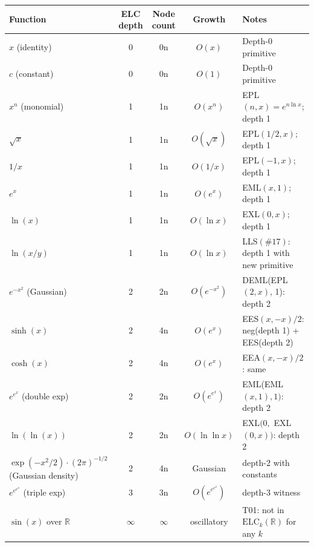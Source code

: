 \documentclass[11pt]{article}
\begin{document}
\begin{longtable}{lcccp{5cm}}
\toprule
Function & ELC depth & Node count & Growth & Notes \\
\midrule
\endhead

$x$ (identity) & 0 & 0n & $O(x)$ & Depth-0 primitive \\

$c$ (constant) & 0 & 0n & $O(1)$ & Depth-0 primitive \\

$x^n$ (monomial) & 1 & 1n & $O(x^n)$ & EPL$(n,x) = e^{n\ln x}$; depth 1 \\

$\sqrt{x}$       & 1 & 1n & $O(\sqrt{x})$ & EPL$(1/2,x)$; depth 1 \\

$1/x$            & 1 & 1n & $O(1/x)$ & EPL$(-1,x)$; depth 1 \\

$e^x$            & 1 & 1n & $O(e^x)$ & EML$(x,1)$; depth 1 \\

$\ln(x)$         & 1 & 1n & $O(\ln x)$ & EXL$(0,x)$; depth 1 \\

$\ln(x/y)$       & 1 & 1n & $O(\ln x)$ & LLS$(\#17)$: depth 1 with new primitive \\

$e^{-x^2}$ (Gaussian) & 2 & 2n & $O(e^{-x^2})$ & DEML(EPL$(2,x)$, 1): depth 2 \\

$\sinh(x)$       & 2 & 4n & $O(e^x)$ & EES$(x,-x)/2$: neg(depth 1) + EES(depth 2) \\

$\cosh(x)$       & 2 & 4n & $O(e^x)$ & EEA$(x,-x)/2$: same \\

$e^{e^x}$ (double exp) & 2 & 2n & $O(e^{e^x})$ & EML(EML$(x,1),1)$: depth 2 \\

$\ln(\ln(x))$    & 2 & 2n & $O(\ln\ln x)$ & EXL$(0,$ EXL$(0,x))$: depth 2 \\

$\exp(-x^2/2)\cdot(2\pi)^{-1/2}$ (Gaussian density) & 2 & 4n & Gaussian & depth-2 with constants \\

$e^{e^{e^x}}$ (triple exp) & 3 & 3n & $O(e^{e^{e^x}})$ & depth-3 witness \\

\midrule

$\sin(x)$ over $\mathbb{R}$ & $\infty$ & $\infty$ & oscillatory & T01: not in $\mathrm{ELC}_k(\mathbb{R})$ for any $k$ \\


\end{longtable}
\end{document}
